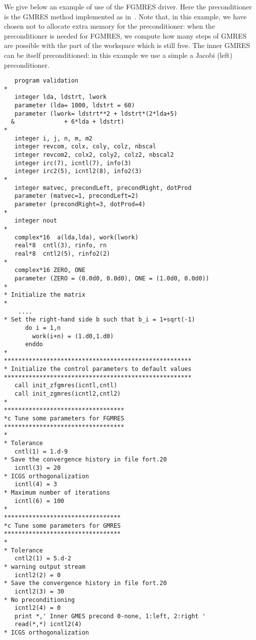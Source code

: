 We give below an example of use of the FGMRES driver. 
Here the preconditioner is the GMRES method implemented as 
in~\cite{fggl:03,fggl:05}.
Note that, in this example, we have chosen not to allocate extra memory for
the preconditioner: when the preconditioner is needed for FGMRES, we
compute how many steps of GMRES are possible with the part of the workspace
which is still free.
The inner GMRES can be itself preconditioned: in this example we use a simple a
Jacobi (left) preconditioner.



\begin{landscape}
\begin{small}
\setlength{\columnseprule}{0.5pt}
\begin{multicols}{2}
\begin{verbatim}
   program validation
*
   integer lda, ldstrt, lwork
   parameter (lda= 1000, ldstrt = 60)
   parameter (lwork= ldstrt**2 + ldstrt*(2*lda+5) 
  &              + 6*lda + ldstrt)
*
   integer i, j, n, m, m2
   integer revcom, colx, coly, colz, nbscal
   integer revcom2, colx2, coly2, colz2, nbscal2
   integer irc(7), icntl(7), info(3)
   integer irc2(5), icntl2(8), info2(3)
*
   integer matvec, precondLeft, precondRight, dotProd
   parameter (matvec=1, precondLeft=2)
   parameter (precondRight=3, dotProd=4)
*
   integer nout
*
   complex*16  a(lda,lda), work(lwork)
   real*8  cntl(3), rinfo, rn
   real*8  cntl2(5), rinfo2(2)
*
   complex*16 ZERO, ONE
   parameter (ZERO = (0.0d0, 0.0d0), ONE = (1.0d0, 0.0d0))
*
* Initialize the matrix
*
    ....
* Set the right-hand side b such that b_i = 1+sqrt(-1)
      do i = 1,n
        work(i+n) = (1.d0,1.d0)
      enddo
*
*****************************************************
* Initialize the control parameters to default values
*****************************************************
   call init_zfgmres(icntl,cntl)
   call init_zgmres(icntl2,cntl2)
*
**********************************
*c Tune some parameters for FGMRES
**********************************
*
* Tolerance
   cntl(1) = 1.d-9
* Save the convergence history in file fort.20
   icntl(3) = 20
* ICGS orthogonalization
   icntl(4) = 3
* Maximum number of iterations
   icntl(6) = 100
*
*********************************
*c Tune some parameters for GMRES
*********************************
*
* Tolerance
   cntl2(1) = 5.d-2
* warning output stream
   icntl2(2) = 0
* Save the convergence history in file fort.20
   icntl2(3) = 30
* No preconditioning
   icntl2(4) = 0
   print *,' Inner GMES precond 0-none, 1:left, 2:right '
   read(*,*) icntl2(4)
* ICGS orthogonalization

\end{verbatim}
\end{multicols}
\end{small}
\end{landscape}

